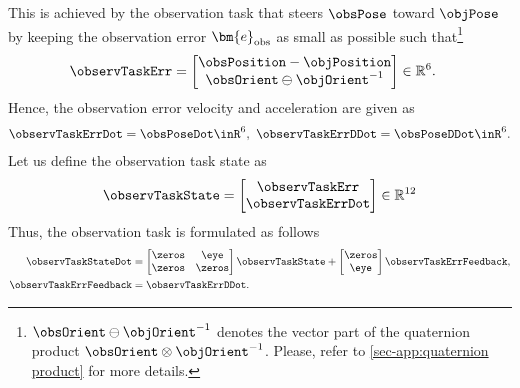 	This is achieved by the observation task that steers $\obsPose$ toward $\objPose$ by keeping the observation error $\bm{e}_{\rm obs}$ as small as possible such that\footnote{$\obsOrient \ominus \objOrient^{-1}$ denotes the vector part of the quaternion product $\obsOrient\otimes\objOrient^{-1}$. Please, refer to \cref{sec-app:quaternion product} for more details.}
	\begin{align}\label{eq:observation error}
		\observTaskErr &= 
		\begin{bmatrix}
			\obsPosition-\objPosition \\ \obsOrient \ominus \objOrient^{-1}
		\end{bmatrix}\in \mathbb{R}^{6}.
	\end{align}
	Hence, the observation error velocity and acceleration are  given as
	\begin{align} 
	\observTaskErrDot = \obsPoseDot\inR^{6}, \ 
		\observTaskErrDDot = \obsPoseDDot\inR^{6}.
	\end{align}
	Let us define the observation task state  as 
	\begin{equation}
		\observTaskState = 	\begin{bmatrix}
			\observTaskErr \\	\observTaskErrDot
		\end{bmatrix}  \in \mathbb{R}^{12}
	\end{equation}
	Thus, the observation task is formulated as follows
	\begin{align}\label{eq:observation task dynamics}
		\observTaskStateDot &= 
		\begin{bmatrix}
			\zeros & \eye \\ \zeros & \zeros
		\end{bmatrix}\observTaskState + 
		\begin{bmatrix}
			\zeros \\ \eye
		\end{bmatrix} \observTaskErrFeedback, \\
		\label{eq:mu observartion task}\observTaskErrFeedback &=\observTaskErrDDot.
	\end{align}
